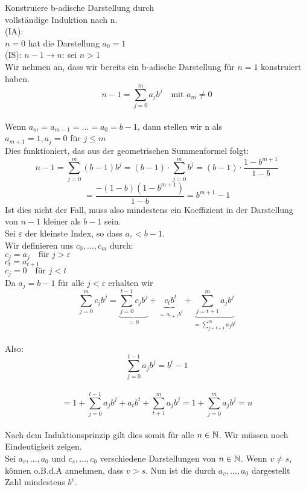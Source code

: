 \documentclass[../ana1u.tex]{subfiles}
\begin{document}
\begin{bew}
    Konstruiere b-adische Darstellung durch\\
    vollständige Induktion nach n.\\
    (IA):\\
    \(n = 0\) hat die Darstellung \(a_0 = 1\)\\
    (IS): \(n - 1 \rightarrow n\): sei \(n > 1\)\\
    Wir nehmen an, dass wir bereits ein b-adische Darstellung für \(n = 1\) konstruiert haben.\\
    \[n-1 = \sum_{j=0}^{m} a_jb^j \quad \text{mit } a_m \neq 0\]\\
    Wenn \(a_m = a_{m-1} = \dots = a_0 = b-1\), dann stellen wir n als\\
    \(a_{m+1} = 1, a_j = 0\) für \(j \leq m\)\\
    Dies funktioniert, das aus der geometrischen Summenformel folgt:\\
    \[n-1 = \sum_{j=0}^{m} (b-1)b^j = (b-1) \cdot \sum_{j=0}^{m}b^j = (b-1) \cdot \frac{1- b^{m+1}}{1-b} \]
    \[= \frac{-(1-b)(1-b^{m+1})}{1-b} = b^{m+1}-1 \]
    Ist dies nicht der Fall, muss also mindestens ein Koeffizient in der Darstellung von \(n-1\) kleiner als \(b-1\) sein.\\
    Sei \(\varepsilon\) der kleinste Index, so dass \(a_{\varepsilon} < b-1\).\\
    Wir definieren uns \(c_0, \dots, c_m\) durch:\\
    \(c_j = a_j \quad \text{für } j > \varepsilon\)\\
    \(c_t = a_{t+1}\)\\
    \(c_j = 0 \quad \text{für } j < t\)\\
    Da \(a_j = b-1\) für alle \(j<\varepsilon\) erhalten wir\\
    \[\sum_{j=0}^{m} c_jb^j = \underbrace{\sum_{j=0}^{t-1} c_jb^j}_{=0} + \underbrace{c_tb^t}_{=a_{t+1}b^t} + \underbrace{\sum_{j=t+1}^{m} a_jb^j}_{=\sum_{j=t+1}^{m} a_jb^j}\]\\
    Also:
    \[\sum_{j=0}^{t-1} a_jb^j = b^t-1\]\\
    \[= 1+\sum_{j=0}^{t-1} a_jb^j + a_tb^t + \sum_{t+1}^{m}a_jb^j = 1+\sum_{j=0}^{m} a_jb^j = n\]\\
    Nach dem Induktionsprinzip gilt dies somit für alle \(n \in \mathbb{N}\). Wir müssen noch Eindeutigkeit zeigen.\\
    Sei \(a_v,\dots, a_0\) und \(c_s,\dots, c_0\) verschiedene Darstellungen von \(n \in \mathbb{N}\). Wenn \(v \neq s\), können o.B.d.A annehmen, dass \(v > s\). Nun ist die durch \(a_v,\dots, a_0\) dargestellt Zahl mindestens \(b^v\).\\

\end{bew}
\end{document}
